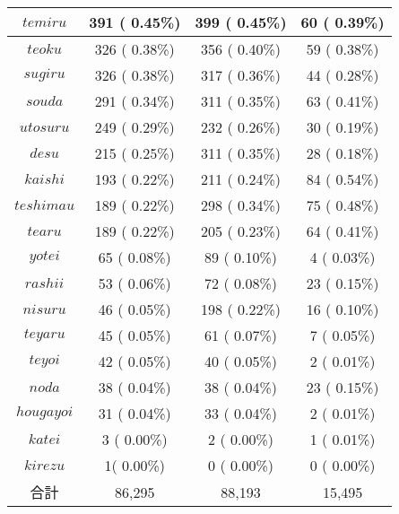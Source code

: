 \documentclass{nlp}
\begin{document}
\begin{table}[!htbp]
\begin{center}
\begin{tabular}{|c|c|c|c|}
$temiru$ & 391 ( 0.45\%) & 399 ( 0.45\%) & 60 ( 0.39\%) \\ \hline
$teoku$ & 326 ( 0.38\%) & 356 ( 0.40\%) & 59 ( 0.38\%) \\ \hline
$sugiru$ & 326 ( 0.38\%) & 317 ( 0.36\%) & 44 ( 0.28\%) \\ \hline
$souda$ & 291 ( 0.34\%) & 311 ( 0.35\%) & 63 ( 0.41\%)  \\ \hline
$utosuru$ & 249 ( 0.29\%) & 232 ( 0.26\%) & 30 ( 0.19\%)  \\ \hline
$desu$ & 215 ( 0.25\%) & 311 ( 0.35\%) & 28 ( 0.18\%) \\ \hline
$kaishi$ & 193 ( 0.22\%) & 211 ( 0.24\%) & 84 ( 0.54\%) \\ \hline
$teshimau$ & 189 ( 0.22\%) & 298 ( 0.34\%) & 75 ( 0.48\%) \\ \hline
$tearu$ & 189 ( 0.22\%) & 205 ( 0.23\%) & 64 ( 0.41\%) \\ \hline
$yotei$ & 65 ( 0.08\%) & 89 ( 0.10\%) & 4 ( 0.03\%) \\ \hline
$rashii$ & 53 ( 0.06\%) & 72 ( 0.08\%) & 23 ( 0.15\%) \\ \hline
$nisuru$ & 46 ( 0.05\%) & 198 ( 0.22\%) & 16 ( 0.10\%) \\ \hline
$teyaru$ & 45 ( 0.05\%) & 61 ( 0.07\%) & 7 ( 0.05\%) \\ \hline
$teyoi$ & 42 ( 0.05\%) & 40 ( 0.05\%) & 2 ( 0.01\%) \\ \hline
$noda$ & 38 ( 0.04\%) & 38 ( 0.04\%) & 23 ( 0.15\%) \\ \hline
$hougayoi$ & 31 ( 0.04\%) & 33 ( 0.04\%) & 2 ( 0.01\%) \\ \hline
$katei$ & 3 ( 0.00\%) & 2 ( 0.00\%) & 1 ( 0.01\%) \\ \hline
$kirezu$ & 1(  0.00\%) & 0 ( 0.00\%) & 0 ( 0.00\%) \\ \hline
合計 & 86,295  & 88,193 & 15,495 \\ \hline
\end{tabular}
\end{center}
\end{table}
\end{document}
